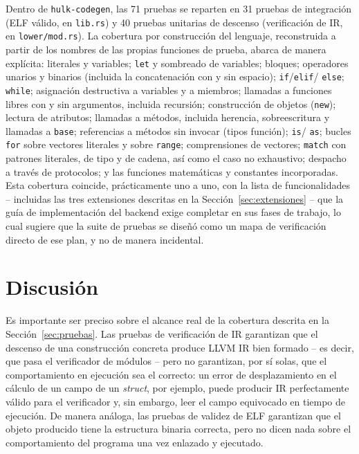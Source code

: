 \documentclass[12pt, a4paper]{article}
\begin{document}
Dentro de \texttt{hulk-codegen}, las 71 pruebas se reparten en 31 pruebas de
integración (ELF válido, en \texttt{lib.rs}) y 40 pruebas unitarias de
descenso (verificación de IR, en \texttt{lower/mod.rs}). La cobertura por
construcción del lenguaje, reconstruida a partir de los nombres de las propias
funciones de prueba, abarca de manera explícita: literales y variables;
\texttt{let} y sombreado de variables; bloques; operadores unarios y binarios
(incluida la concatenación con y sin espacio); \texttt{if}/\texttt{elif}/
\texttt{else}; \texttt{while}; asignación destructiva a variables y a
miembros; llamadas a funciones libres con y sin argumentos, incluida
recursión; construcción de objetos (\texttt{new}); lectura de atributos;
llamadas a métodos, incluida herencia, sobreescritura y llamadas a
\texttt{base}; referencias a métodos sin invocar (tipos función); \texttt{is}/
\texttt{as}; bucles \texttt{for} sobre vectores literales y sobre
\texttt{range}; comprensiones de vectores; \texttt{match} con patrones
literales, de tipo y de cadena, así como el caso no exhaustivo; despacho a
través de protocolos; y las funciones matemáticas y constantes incorporadas.
Esta cobertura coincide, prácticamente uno a uno, con la lista de
funcionalidades -- incluidas las tres extensiones descritas en la
Sección~\ref{sec:extensiones} -- que la guía de implementación del backend
exige completar en sus fases de trabajo, lo cual sugiere que la suite de
pruebas se diseñó como un mapa de verificación directo de ese plan, y no de
manera incidental.


\section{Discusión}
\label{sec:discusion}

Es importante ser preciso sobre el alcance real de la cobertura descrita en la
Sección~\ref{sec:pruebas}. Las pruebas de verificación de IR garantizan que el
descenso de una construcción concreta produce LLVM IR bien formado -- es
decir, que pasa el verificador de módulos -- pero no garantizan, por sí
solas, que el comportamiento en ejecución sea el correcto: un error de
desplazamiento en el cálculo de un campo de un \textit{struct}, por ejemplo,
puede producir IR perfectamente válido para el verificador y, sin embargo,
leer el campo equivocado en tiempo de ejecución. De manera análoga, las
pruebas de validez de ELF garantizan que el objeto producido tiene la
estructura binaria correcta, pero no dicen nada sobre el comportamiento del
programa una vez enlazado y ejecutado.
\end{document}
